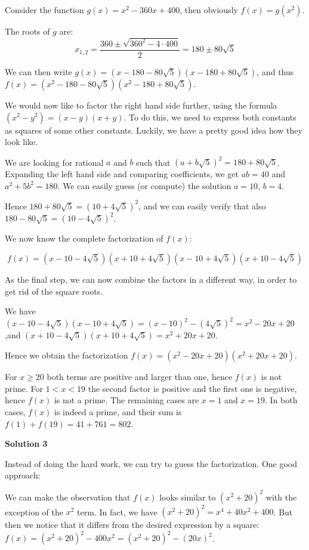 \begin{enumerate}
 Consider the function $g(x) = x^2 - 360x + 400$, then obviously $f(x) = g(x^2)$.

 The roots of $g$ are:
 \[x_{1,2}  = \frac{ 360 \pm \sqrt{ 360^2 - 4\cdot 400 } }2  = 180 \pm 80 \sqrt 5\]

 We can then write $g(x) = (x - 180 - 80\sqrt 5)(x - 180 + 80\sqrt 5)$, and thus $f(x) = (x^2 - 180 - 80\sqrt 5)(x^2 - 180 + 80\sqrt 5)$.

 We would now like to factor the right hand side further, using the formula $(x^2 - y^2) = (x-y)(x+y)$. To do this, we need to express both constants as squares of some other constants. Luckily, we have a pretty good idea how they look like.

 We are looking for rational $a$ and $b$ such that $(a+b\sqrt 5)^2 = 180 + 80\sqrt 5$. Expanding the left hand side and comparing coefficients, we get $ab=40$ and $a^2 + 5b^2 = 180$. We can easily guess (or compute) the solution $a=10$, $b=4$.

 Hence $180 + 80\sqrt 5 = (10 + 4\sqrt 5)^2$, and we can easily verify that also $180 - 80\sqrt 5 = (10 - 4\sqrt 5)^2$.

 We now know the complete factorization of $f(x)$: 

 
 \[f(x) = (x - 10 - 4\sqrt 5)(x + 10 + 4\sqrt 5)(x - 10 + 4\sqrt 5)(x + 10 - 4\sqrt 5)\]

 As the final step, we can now combine the factors in a different way, in order to get rid of the square roots. 

 We have $(x - 10 - 4\sqrt 5)(x - 10 + 4\sqrt 5) = (x-10)^2 - (4\sqrt 5)^2 = x^2 - 20x + 20$,and $(x + 10 - 4\sqrt 5)(x + 10 + 4\sqrt 5) = x^2 + 20x + 20$.

 Hence we obtain the factorization $f(x) = (x^2 - 20x + 20)(x^2 + 20x + 20)$.

 For $x\geq 20$ both terms are positive and larger than one, hence $f(x)$ is not prime. For $1<x<19$ the second factor is positive and the first one is negative, hence $f(x)$ is not a prime. The remaining cases are $x=1$ and $x=19$. In both cases, $f(x)$ is indeed a prime, and their sum is $f(1) + f(19) = 41 + 761 = \boxed{802}$.

 



\textbf{Solution 3}

Instead of doing the hard work, we can try to guess the factorization. One good approach:

 We can make the observation that $f(x)$ looks similar to $(x^2 + 20)^2$ with the exception of the $x^2$ term. In fact, we have $(x^2 + 20)^2 = x^4 + 40x^2 + 400$. But then we notice that it differs from the desired expression by a square: $f(x) = (x^2 + 20)^2 - 400x^2 = (x^2 + 20)^2 - (20x)^2$.


\end{enumerate}
